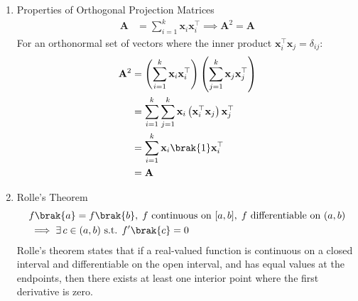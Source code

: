\begin{enumerate}[label=\thesubsection.\arabic*, ref=\thesubsection.\theenumi]
	\item Properties of Orthogonal Projection Matrices
	\begin{align}
		\mathbf{A} &= \sum_{i=1}^k \mathbf{x}_i \mathbf{x}_i^\top \implies \mathbf{A}^2 = \mathbf{A} \label{eq:DA2025-orthogonal_projection}
	\end{align}
	\solution
	For an orthonormal set of vectors where the inner product $\mathbf{x}_i^\top \mathbf{x}_j = \delta_{ij}$:
	\begin{align}
		\mathbf{A}^2 &= \left(\sum_{i=1}^k \mathbf{x}_i \mathbf{x}_i^\top\right) \left(\sum_{j=1}^k \mathbf{x}_j \mathbf{x}_j^\top\right)
		\\
		&= \sum_{i=1}^k \sum_{j=1}^k \mathbf{x}_i \left(\mathbf{x}_i^\top \mathbf{x}_j\right) \mathbf{x}_j^\top
		\\
		&= \sum_{i=1}^k \mathbf{x}_i \brak{1} \mathbf{x}_i^\top
		\\
		&= \mathbf{A}
	\end{align}
	
	
	
\item Rolle's Theorem
\begin{align}
	\begin{split}
		&f\brak{a} = f\brak{b}, \; f \text{ continuous on } [a, b], \; f \text{ differentiable on } (a, b) \\
		&\implies \exists \, c \in (a, b) \text{ s.t. } f'\brak{c} = 0
	\end{split} \label{eq:DA2025-rolles}
\end{align}
Rolle's theorem states that if a real-valued function is continuous on a closed interval and differentiable on the open interval, and has equal values at the endpoints, then there exists at least one interior point where the first derivative is zero.
	

\end{enumerate}
